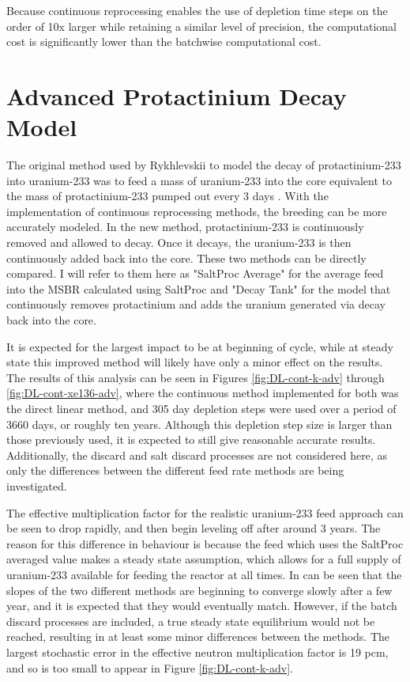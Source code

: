 Because continuous reprocessing enables the use of depletion time steps on the order of 10x larger while retaining a similar level of precision, the computational cost is significantly lower than the batchwise computational cost.

\section{Advanced Protactinium Decay Model}
\label{s:advance-decay}

The original method used by Rykhlevskii to model the decay of protactinium-233 into uranium-233 was to feed a mass of uranium-233 into the core equivalent to the mass of protactinium-233 pumped out every 3 days \cite{rykhlevskii_advanced_2018}. With the implementation of continuous reprocessing methods, the breeding can be more accurately modeled. In the new method, protactinium-233 is continuously removed and allowed to decay. Once it decays, the uranium-233 is then continuously added back into the core. These two methods can be directly compared. I will refer to them here as "SaltProc Average" for the average feed into the MSBR calculated using SaltProc and "Decay Tank" for the model that continuously removes protactinium and adds the uranium generated via decay back into the core.

It is expected for the largest impact to be at beginning of cycle, while at steady state this improved method will likely have only a minor effect on the results. The results of this analysis can be seen in Figures \ref{fig:DL-cont-k-adv} through \ref{fig:DL-cont-xe136-adv}, where the continuous method implemented for both was the direct linear method, and 305 day depletion steps were used over a period of 3660 days, or roughly ten years. Although this depletion step size is larger than those previously used, it is expected to still give reasonable accurate results. Additionally, the discard and salt discard processes are not considered here, as only the differences between the different feed rate methods are being investigated.

The effective multiplication factor for the realistic uranium-233 feed approach can be seen to drop rapidly, and then begin leveling off after around 3 years.
The reason for this difference in behaviour is because the feed which uses the SaltProc averaged value makes a steady state assumption, which allows for a full supply of uranium-233 available for feeding the reactor at all times.
In can be seen that the slopes of the two different methods are beginning to converge slowly after a few year, and it is expected that they would eventually match.
However, if the batch discard processes are included, a true steady state equilibrium would not be reached, resulting in at least some minor differences between the methods.
The largest stochastic error in the effective neutron multiplication factor is 19 pcm, and so is too small to appear in Figure \ref{fig:DL-cont-k-adv}.

